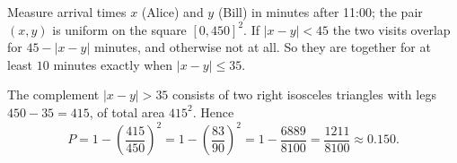 Measure arrival times $x$ (Alice) and $y$ (Bill) in minutes after 11{:}00; the pair $(x,y)$ is uniform on the square $[0,450]^2$. If $|x-y|<45$ the two visits overlap for $45-|x-y|$ minutes, and otherwise not at all. So they are together for at least $10$ minutes exactly when $|x-y|\le35$.

The complement $|x-y|>35$ consists of two right isosceles triangles with legs $450-35=415$, of total area $415^2$. Hence
\[
P=1-\left(\dfrac{415}{450}\right)^2=1-\left(\dfrac{83}{90}\right)^2=1-\dfrac{6889}{8100}=\boxed{\dfrac{1211}{8100}}\approx0.150 .
\]
